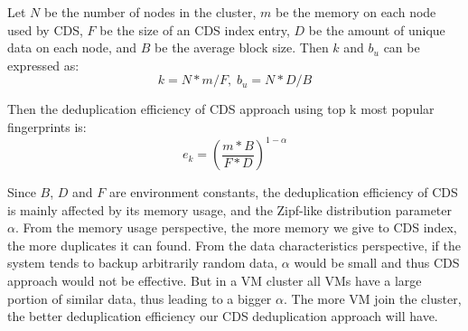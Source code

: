 

Let $N$ be the number of nodes in the cluster, $m$ be the memory on each node used by CDS, 
$F$ be the size of an CDS index entry,
$D$ be the amount of unique data on each node, and $B$ be the average block size. Then $k$ and $b_u$ can be expressed as:
\begin{equation*}
k = N*m/F,\; b_u = N*D/B
\end{equation*}

Then the deduplication efficiency of CDS approach using top k most popular fingerprints is:
\begin{equation}
  e_k = (\frac{m*B}{F*D})^{1-\alpha}
\end{equation}

Since $B$, $D$ and $F$ are environment constants, the deduplication efficiency of CDS is mainly affected by its memory usage,
and the Zipf-like distribution parameter $\alpha$.
From the memory usage perspective, the more memory we give to CDS index, the more duplicates it can found.
From the data characteristics perspective, if the system tends to backup arbitrarily random data, 
$\alpha$ would be small and thus CDS approach would not be effective. But in a VM cluster all VMs
have a large portion of similar data, thus leading to a bigger $\alpha$. The more VM join the cluster,
the better deduplication efficiency our CDS deduplication approach will have.


